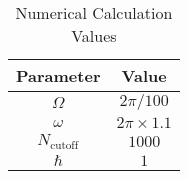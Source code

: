 \begin{table}[ht]
        \centering
        \caption{Numerical Calculation Values}
        \label{tab:numerical_values}
        \begin{tabular}{|c|c|}
                \hline
                Parameter & Value \\
                \hline
                $\Omega$ & $2\pi/100$ \\
                $\omega$ & $2\pi \times 1.1$ \\
                $N_{\text{cutoff}}$ & $1000$ \\
                $\hbar$ & $1$ \\
                \hline
        \end{tabular}
\end{table}


